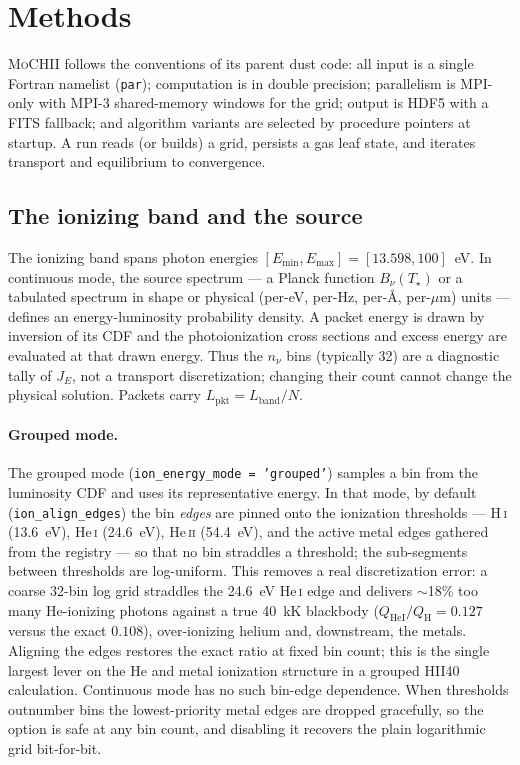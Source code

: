 \documentclass[twocolumn,linenumbers]{aastex702}
\newcommand{\code}[1]{\texttt{#1}}
\newcommand{\MoCHII}{\textsc{MoCHII}}
\newcommand{\HI}{H\,\textsc{i}}
\newcommand{\HeI}{He\,\textsc{i}}
\newcommand{\HeII}{He\,\textsc{ii}}
\newcommand{\QH}{Q_{\mathrm{H}}}
\begin{document}
\section{Methods}
\label{sec:methods}

\MoCHII{} follows the conventions of its parent dust code: all input is a
single Fortran namelist (\code{par}); computation is in double precision;
parallelism is MPI-only with MPI-3 shared-memory windows for the grid;
output is HDF5 with a FITS fallback; and algorithm variants are selected
by procedure pointers at startup.  A run reads (or builds) a grid, persists
a gas leaf state, and iterates transport and equilibrium to convergence.

\subsection{The ionizing band and the source}
\label{sec:band}

The ionizing band spans photon energies $[E_{\min}, E_{\max}] =
[13.598, 100]$~eV.  In continuous mode, the source spectrum --- a Planck
function $B_\nu(T_\star)$ or a tabulated spectrum in shape or physical
(per-eV, per-Hz, per-\AA, per-$\mu$m) units --- defines an energy-luminosity
probability density.  A packet energy is drawn by inversion of its CDF and
the photoionization cross sections and excess energy are evaluated at that
drawn energy.  Thus the $n_\nu$ bins (typically 32) are a diagnostic tally
of $J_E$, not a transport discretization; changing their count cannot change
the physical solution.  Packets carry $L_{\mathrm{pkt}} =
L_{\mathrm{band}}/N$.

\paragraph{Grouped mode.}  The grouped mode
(\code{ion\_energy\_mode = 'grouped'}) samples a bin from the luminosity CDF
and uses its representative energy.  In that mode, by default
(\code{ion\_align\_edges})
the bin \emph{edges} are pinned onto the ionization thresholds --- \HI{}
(13.6~eV), \HeI{} (24.6~eV), \HeII{} (54.4~eV), and the active metal
edges gathered from the registry --- so that no bin straddles a threshold;
the sub-segments between thresholds are log-uniform.  This removes a real
discretization error: a coarse 32-bin log grid straddles the 24.6~eV \HeI{}
edge and delivers $\sim$18\% too many He-ionizing photons against a true
40~kK blackbody ($Q_{\mathrm{HeI}}/\QH = 0.127$ versus the exact
$0.108$), over-ionizing helium and, downstream, the metals.  Aligning the
edges restores the exact ratio at fixed bin count; this is the single
largest lever on the He and metal ionization structure in a grouped HII40
calculation.  Continuous mode has no such bin-edge dependence.  When
thresholds outnumber bins the
lowest-priority metal edges are dropped gracefully, so the option is safe
at any bin count, and disabling it recovers the plain logarithmic grid
bit-for-bit.
\end{document}
